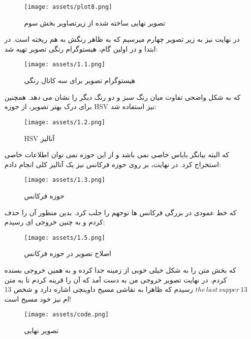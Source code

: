 \documentclass[a4paper,12pt]{article}
\begin{document}
\begin{figure}[h]
	\centering
	\texttt{[image: assets/plot8.png]}
	\caption{\textcolor{CustomAccent}{تصویر نهایی ساخته شده از زیرتصاویر بخش سوم}}
\end{figure}


در نهایت نیز به زیر تصویر چهارم میرسیم که به ظاهر رنگش به هم ریخته است. در ابتدا و در اولین گام، هیستوگرام رنگی تصویر تهیه شد:

\begin{figure}[h]
	\centering
	\texttt{[image: assets/1.1.png]}
	\caption{\textcolor{CustomAccent}{هیستوگرام تصویر برای سه کانال رنگی}}
\end{figure}



که به شکل واضحی تفاوت میان رنگ سبز و دو رنگ دیگر را نشان می دهد. همچنین برای درک بهتر تصویر، از حوزه HSV نیز استفاده شد:

\pagebreak

\begin{figure}[h]
	\centering
	\texttt{[image: assets/1.2.png]}
	\caption{\textcolor{CustomAccent}{HSV آنالیز}}
\end{figure}

که البته بیانگر بایاس خاصی نمی باشد و از این حوزه نمی توان اطلاعات خاصی استخراج کرد. 
در نهایت، بر روی حوزه فرکانس نیز یک آنالیز کلی انجام دادم:

\begin{figure}[h]
	\centering
	\texttt{[image: assets/1.3.png]}
	\caption{\textcolor{CustomAccent}{حوزه فرکانس}}
\end{figure}

که خط عمودی در بزرگی فرکانس ها توجهم را جلب کرد. بدین منظور آن را حذف کردم و به چنین خروجی ای رسیدم:

\begin{figure}[h!]
	\centering
	\texttt{[image: assets/1.5.png]}
	\caption{\textcolor{CustomAccent}{اصلاح تصویر در حوزه فرکانس}}
\end{figure}
که بخش متن را به شکل خیلی خوبی از زمینه جدا کرده و به همین خروجی بسنده کردم.
در نهایت تصویر خروجی من به دست آمد  که آن را قرینه کردم تا به متن
$
the \, last \, supper \, 13
$
رسیدم که ظاهرا به نقاشی مسیح داوینچی اشاره دارد و شخص 13 ام نیز خود مسیح است!

\begin{figure}[h!]
	\centering
	\texttt{[image: assets/code.png]}
	\caption{\textcolor{CustomAccent}{تصویر نهایی}}
\end{figure}
\end{document}

